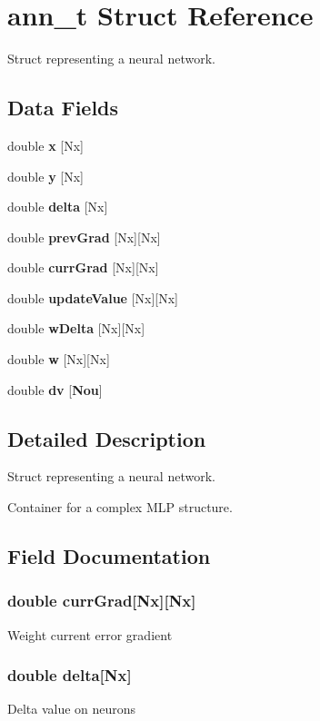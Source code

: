\section{ann\+\_\+t Struct Reference}
\label{structann__t}


Struct representing a neural network.  


\subsection*{Data Fields}
\begin{DoxyCompactItemize}
\item 
double {\bf x} [Nx]
\item 
double {\bf y} [Nx]
\item 
double {\bf delta} [Nx]
\item 
double {\bf prev\+Grad} [Nx][Nx]
\item 
double {\bf curr\+Grad} [Nx][Nx]
\item 
double {\bf update\+Value} [Nx][Nx]
\item 
double {\bf w\+Delta} [Nx][Nx]
\item 
double {\bf w} [Nx][Nx]
\item 
double {\bf dv} [{\bf Nou}]
\end{DoxyCompactItemize}


\subsection{Detailed Description}
Struct representing a neural network. 

Container for a complex M\+L\+P structure. 

\subsection{Field Documentation}
\subsubsection[{curr\+Grad}]{\setlength{\rightskip}{0pt plus 5cm}double curr\+Grad[Nx][Nx]}\label{structann__t_ad634fb273a77c89ef50752fe62499b4f}
Weight current error gradient 
\subsubsection[{delta}]{\setlength{\rightskip}{0pt plus 5cm}double delta[Nx]}\label{structann__t_a610000125df6a3004a1a0768bee350be}
Delta value on neurons 
